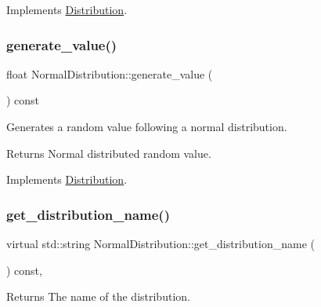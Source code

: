 Implements \hyperlink{classDistribution_a0778c93fb686dd1abe2830e1c7e564a6}{Distribution}.

\mbox{\label{classNormalDistribution_a121b2abfc13fc376512aa4f7e2fb1bb4}} 
\subsubsection{\texorpdfstring{generate\+\_\+value()}{generate\_value()}}
{\footnotesize\ttfamily float Normal\+Distribution\+::generate\+\_\+value (\begin{DoxyParamCaption}{ }\end{DoxyParamCaption}) const\hspace{0.3cm}{\ttfamily [virtual]}}

Generates a random value following a normal distribution. \begin{DoxyReturn}{Returns}
Normal distributed random value. 
\end{DoxyReturn}


Implements \hyperlink{classDistribution_aa1ea89994ac123f003b8b8f5fe6fad40}{Distribution}.

\mbox{\label{classNormalDistribution_a13afb9f11a9d643ff1af5de2ca066005}} 
\subsubsection{\texorpdfstring{get\+\_\+distribution\+\_\+name()}{get\_distribution\_name()}}
{\footnotesize\ttfamily virtual std\+::string Normal\+Distribution\+::get\+\_\+distribution\+\_\+name (\begin{DoxyParamCaption}{ }\end{DoxyParamCaption}) const\hspace{0.3cm}{\ttfamily [inline]}, {\ttfamily [virtual]}}

\begin{DoxyReturn}{Returns}
The name of the distribution. 
\end{DoxyReturn}


